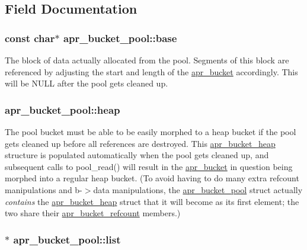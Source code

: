 \subsection{Field Documentation}
\hypertarget{structapr__bucket__pool_a9ee5297361ba548a20c3aa626a37c068}{
\subsubsection[{base}]{\setlength{\rightskip}{0pt plus 5cm}const char$\ast$ apr\-\_\-bucket\-\_\-pool\-::base}}\label{structapr__bucket__pool_a9ee5297361ba548a20c3aa626a37c068}
The block of data actually allocated from the pool. Segments of this block are referenced by adjusting the start and length of the \hyperlink{structapr__bucket}{apr\-\_\-bucket} accordingly. This will be N\-U\-L\-L after the pool gets cleaned up. \hypertarget{structapr__bucket__pool_a0fe0b0dedea28fb1ed0a1a0f42338225}{
\subsubsection[{heap}]{ apr\-\_\-bucket\-\_\-pool\-::heap}}\label{structapr__bucket__pool_a0fe0b0dedea28fb1ed0a1a0f42338225}
The pool bucket must be able to be easily morphed to a heap bucket if the pool gets cleaned up before all references are destroyed. This \hyperlink{structapr__bucket__heap}{apr\-\_\-bucket\-\_\-heap} structure is populated automatically when the pool gets cleaned up, and subsequent calls to pool\-\_\-read() will result in the \hyperlink{structapr__bucket}{apr\-\_\-bucket} in question being morphed into a regular heap bucket. (To avoid having to do many extra refcount manipulations and b-\/$>$data manipulations, the \hyperlink{structapr__bucket__pool}{apr\-\_\-bucket\-\_\-pool} struct actually {\itshape contains} the \hyperlink{structapr__bucket__heap}{apr\-\_\-bucket\-\_\-heap} struct that it will become as its first element; the two share their \hyperlink{structapr__bucket__refcount}{apr\-\_\-bucket\-\_\-refcount} members.) \hypertarget{structapr__bucket__pool_a651aa0c18658342daf72ff86680bfaca}{
\subsubsection[{list}]{$\ast$ apr\-\_\-bucket\-\_\-pool\-::list}}\label{structapr__bucket__pool_a651aa0c18658342daf72ff86680bfaca}
